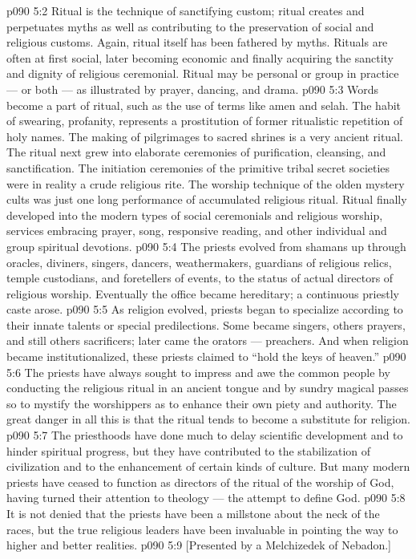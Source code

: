 \vs p090 5:2 Ritual is the technique of sanctifying custom; ritual creates and perpetuates myths as well as contributing to the preservation of social and religious customs. Again, ritual itself has been fathered by myths. Rituals are often at first social, later becoming economic and finally acquiring the sanctity and dignity of religious ceremonial. Ritual may be personal or group in practice --- or both --- as illustrated by prayer, dancing, and drama.
\vs p090 5:3 Words become a part of ritual, such as the use of terms like amen and selah. The habit of swearing, profanity, represents a prostitution of former ritualistic repetition of holy names. The making of pilgrimages to sacred shrines is a very ancient ritual. The ritual next grew into elaborate ceremonies of purification, cleansing, and sanctification. The initiation ceremonies of the primitive tribal secret societies were in reality a crude religious rite. The worship technique of the olden mystery cults was just one long performance of accumulated religious ritual. Ritual finally developed into the modern types of social ceremonials and religious worship, services embracing prayer, song, responsive reading, and other individual and group spiritual devotions.
\vs p090 5:4 \pc The priests evolved from shamans up through oracles, diviners, singers, dancers, weathermakers, guardians of religious relics, temple custodians, and foretellers of events, to the status of actual directors of religious worship. Eventually the office became hereditary; a continuous priestly caste arose.
\vs p090 5:5 As religion evolved, priests began to specialize according to their innate talents or special predilections. Some became singers, others prayers, and still others sacrificers; later came the orators --- preachers. And when religion became institutionalized, these priests claimed to “hold the keys of heaven.”
\vs p090 5:6 The priests have always sought to impress and awe the common people by conducting the religious ritual in an ancient tongue and by sundry magical passes so to mystify the worshippers as to enhance their own piety and authority. The great danger in all this is that the ritual tends to become a substitute for religion.
\vs p090 5:7 The priesthoods have done much to delay scientific development and to hinder spiritual progress, but they have contributed to the stabilization of civilization and to the enhancement of certain kinds of culture. But many modern priests have ceased to function as directors of the ritual of the worship of God, having turned their attention to theology --- the attempt to define God.
\vs p090 5:8 It is not denied that the priests have been a millstone about the neck of the races, but the true religious leaders have been invaluable in pointing the way to higher and better realities.
\vsetoff
\vs p090 5:9 [Presented by a Melchizedek of Nebadon.]
\quizlink
